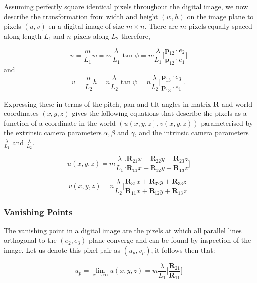 \documentclass[12pt]{article}
\newcommand{\mtx}[1]{\ensuremath{\mathbf{#1}}}
\begin{document}
Assuming perfectly square identical pixels throughout the digital image, we now describe the transformation from width and height $(w,h)$ on the image plane to pixels $(u,v)$ on a digital image of size $m\times n$. There are $m$ pixels equally spaced along length $L_1$ and $n$ pixels along $L_2$ therefore,

$$
u = \frac{m}{L_1}w = m\frac{\lambda}{L_1}\tan\phi
 = m\frac{\lambda}{L_1} 
\bigg[ \frac{\textbf{p}_{12}\cdot e_2}{\textbf{p}_{12}\cdot e_1}\bigg]
$$
and
$$
v = \frac{n}{L_2}h=n\frac{\lambda}{L_2}{\tan\psi}
 = n\frac{\lambda}{L_2}
\bigg[\frac{\textbf{p}_{13}\cdot e_3}{\textbf{p}_{13}\cdot e_1}\bigg].
$$

Expressing these in terms of the pitch, pan and tilt angles in matrix $\mtx{R}$ and world coordinates $(x,y,z)$ gives the following equations that describe the pixels as a function of a coordinate in the world $(u(x,y,z),v(x,y,z))$ parameterised by the extrinsic camera parameters $\alpha, \beta$ and $\gamma$, and the intrinsic camera parameters $\frac{\lambda}{L_1}$ and $\frac{\lambda}{L_2}$.

\begin{equation}\label{u}
u(x,y,z) = m\frac{\lambda}{L_1}
\bigg[ \frac{\mtx{R}_{21}x+ \mtx{R}_{22}y + \mtx{R}_{23}z}
{\mtx{R}_{11}x+ \mtx{R}_{12}y + \mtx{R}_{13}z} \bigg]
\end{equation}

\begin{equation}\label{v}
v(x,y,z)= n\frac{\lambda}{L_2}
\bigg[ \frac{\mtx{R}_{31}x+ \mtx{R}_{32}y + \mtx{R}_{33}z}
{\mtx{R}_{11}x+ \mtx{R}_{12}y + \mtx{R}_{13}z} \bigg]
\end{equation}


\subsubsection{Vanishing Points}

The vanishing point in a digital image are the pixels at which all parallel lines orthogonal to the  $(e_2,e_3)$ plane converge and can be found by inspection of the image. Let us denote this pixel pair as $(u_p, v_p)$, it follows then that:

\begin{equation}\label{up}
u_p = \lim_{x\to\infty} u(x,y,z) = m\frac{\lambda}{L_1}
\bigg[\frac{\mtx{R}_{21}}
{\mtx{R}_{11}} \bigg]
\end{equation}
\end{document}
